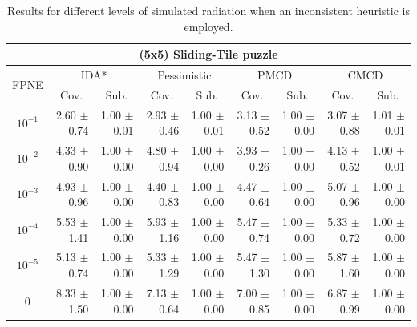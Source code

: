 \documentclass[letterpaper]{article}
\begin{document}
\begin{table}[t]
\centering
\setlength{\tabcolsep}{5 pt}
\begin{tabular}{| c | r  r | r  r | r  r | r  r |}
\hline
\multicolumn{9}{|c|}{\textbf{(5x5) Sliding-Tile puzzle}} \\
\hline
\multirow{2}{*}{FPNE}	& \multicolumn{2}{|c|}{IDA*} 	& \multicolumn{2}{|c|}{Pessimistic} 	& \multicolumn{2}{|c|}{PMCD} 	& \multicolumn{2}{|c|}{CMCD} 	\\
\cline{2-9}
& \multicolumn{1}{c}{Cov.} & \multicolumn{1}{c|}{Sub.} 	& \multicolumn{1}{c}{Cov.} & \multicolumn{1}{c|}{Sub.} 	& \multicolumn{1}{c}{Cov.} & \multicolumn{1}{c|}{Sub.} 	& \multicolumn{1}{c}{Cov.} & \multicolumn{1}{c|}{Sub.} 	\\
\hline
$10^{-1}$	 & 2.60 $\pm$ 0.74	 & 1.00 $\pm$ 0.01	 & 2.93 $\pm$ 0.46	 & 1.00 $\pm$ 0.01	 & 3.13 $\pm$ 0.52	 & 1.00 $\pm$ 0.00	 & 3.07 $\pm$ 0.88	 & 1.01 $\pm$ 0.01	\\
$10^{-2}$	 & 4.33 $\pm$ 0.90	 & 1.00 $\pm$ 0.00	 & 4.80 $\pm$ 0.94	 & 1.00 $\pm$ 0.00	 & 3.93 $\pm$ 0.26	 & 1.00 $\pm$ 0.00	 & 4.13 $\pm$ 0.52	 & 1.00 $\pm$ 0.01	\\
$10^{-3}$	 & 4.93 $\pm$ 0.96	 & 1.00 $\pm$ 0.00	 & 4.40 $\pm$ 0.83	 & 1.00 $\pm$ 0.00	 & 4.47 $\pm$ 0.64	 & 1.00 $\pm$ 0.00	 & 5.07 $\pm$ 0.96	 & 1.00 $\pm$ 0.00	\\
$10^{-4}$	 & 5.53 $\pm$ 1.41	 & 1.00 $\pm$ 0.00	 & 5.93 $\pm$ 1.16	 & 1.00 $\pm$ 0.00	 & 5.47 $\pm$ 0.74	 & 1.00 $\pm$ 0.00	 & 5.33 $\pm$ 0.72	 & 1.00 $\pm$ 0.00	\\
$10^{-5}$	 & 5.13 $\pm$ 0.74	 & 1.00 $\pm$ 0.00	 & 5.33 $\pm$ 1.29	 & 1.00 $\pm$ 0.00	 & 5.47 $\pm$ 1.30	 & 1.00 $\pm$ 0.00	 & 5.87 $\pm$ 1.60	 & 1.00 $\pm$ 0.00	\\
0 	 & 8.33 $\pm$ 1.50	 & 1.00 $\pm$ 0.00 	 & 7.13 $\pm$ 0.64	 & 1.00 $\pm$ 0.00 	 & 7.00 $\pm$ 0.85	 & 1.00 $\pm$ 0.00 	 & 6.87 $\pm$ 0.99	 & 1.00 $\pm$ 0.00 	\\
\hline
\end{tabular}
\caption{Results for different levels of simulated radiation when an inconsistent heuristic is employed.}
\label{tab:24puzzle}
\end{table}
\end{document}
